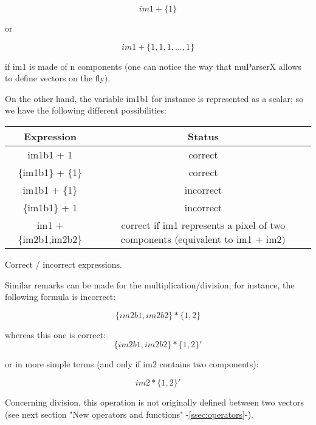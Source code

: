 \begin{equation}
  im1+\{ 1 \}
\end{equation}


or

\begin{equation}
  im1 + \{1,1,1,...,1\}
\end{equation}

if im1 is made of n components (one can notice the way that muParserX allows to define vectors on the fly). 

On the other hand, the variable im1b1 for instance is represented as a scalar; so we have the following different possibilities:

\begin{center} 
\begin{tabular}{||c|c||}
\hline
\bf Expression & \bf Status \\
\hline\hline
im1b1 + 1 & correct \\
\{im1b1\} + \{1\} & correct \\
im1b1 + \{1\} & incorrect \\
\{im1b1\} + 1 & incorrect \\
im1 + \{im2b1,im2b2\} & correct if im1 represents a pixel of two components (equivalent to  im1 + im2) \\
\hline
\end{tabular}
\end{center}
\caption{Correct / incorrect expressions.}
\label{correctness}


Similar remarks can be made for the multiplication/division; for instance, the following formula is incorrect:

\begin{equation}
  \{im2b1,im2b2\} * \{1,2\}
\end{equation}

whereas this one is correct:
\begin{equation}
  \{im2b1,im2b2\} * \{1,2\}'
\end{equation}

or in more simple terms (and only if im2 contains two components): 

\begin{equation}
  im2* \{1,2\}'
\end{equation}

Concerning division, this operation is not originally defined between two vectors (see next section "New operators and functions" -\ref{ssec:operators}-).

\newline

